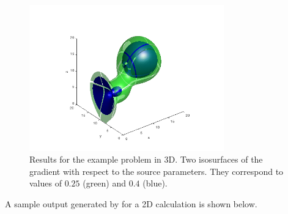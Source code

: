 \begin{figure}
  {\centerline{\includegraphics[width=0.75\textwidth]{cvsadjkryx_p3Dgrad.png}}}
  \caption{Results for the  example problem in 3D.
  Two isosurfaces of the gradient with respect to the source parameters. They correspond
  to values of $0.25$ (green) and $0.4$ (blue).}\label{f:cvsAtmDisp_ASAi_kry_bbd_p3D_b}  
\end{figure}
A sample output generated by  for a 2D calculation
is shown below.


